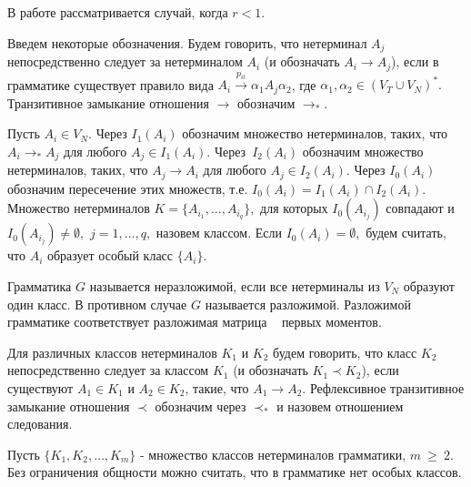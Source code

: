 \documentclass[10pt]{article}
\begin{document}
В работе рассматривается случай, когда $r < 1.$ 

Введем некоторые обозначения. 
Будем говорить, что нетерминал $A_j$ непосредственно следует за нетерминалом  $A_i$ 
(и обозначать $A_i \rightarrow A_j$), если в грамматике существует правило вида $A_i\stackrel{p_{il}}{\rightarrow}\alpha_1 A_j \alpha_2$, где $\alpha_1,\alpha_2 \in (V_T \cup V_N)^*.$ 
Транзитивное замыкание отношения $\rightarrow$ обозначим $\rightarrow _*.$

Пусть $A_i \in V_N.$ Через $I_1(A_i)$ обозначим множество нетерминалов, таких, что $A_i \rightarrow_* A_j$ для любого $A_j \in I_1(A_i).$ 
Через~$I_2(A_i)$ обозначим множество нетерминалов, таких, что $A_j \rightarrow A_i$
для любого $A_j \in I_2(A_i).$
Через $I_0(A_i)$ обозначим пересечение этих множеств, т.е. $I_0(A_i)=I_1(A_i)
\cap I_2(A_i).$ Множество нетерминалов $K=\{A_{i_1},\ldots,A_{i_q}\},$ для
которых $I_0(A_{i_j})$ совпадают и $I_0(A_{i_j}) \neq \emptyset,$ $%
j=1,\ldots,q,$ назовем классом. Если $I_0(A_i)= \emptyset,$ будем
считать, что $A_i$ образует особый класс $\{A_i\}.$

Грамматика $G$ называется
неразложимой, если все нетерминалы из $V_N$ образуют один класс.
В противном случае $G$ называется разложимой.
Разложимой грамматике соответствует разложимая
матрица ~\cite{zhilbib7} первых моментов.

Для различных классов нетерминалов $K_1$ и $K_2$ будем говорить, что класс $K_2$ непосредственно следует за классом $K_1$ (и обозначать $K_1 \prec K_2$), если 
существуют $A_1 \in K_1$ и $A_2 \in K_2$, такие, что $A_1 \rightarrow A_2.$
Рефлексивное транзитивное замыкание отношения $\prec$ обозначим через $\prec _*$ и назовем отношением следования.

Пусть $\{K_1, K_2, \ldots,K_m\}$ - множество классов нетерминалов грамматики, $m ~\ge ~2$. 
Без ограничения общности можно считать, что в грамматике нет особых классов. 
\end{document}
